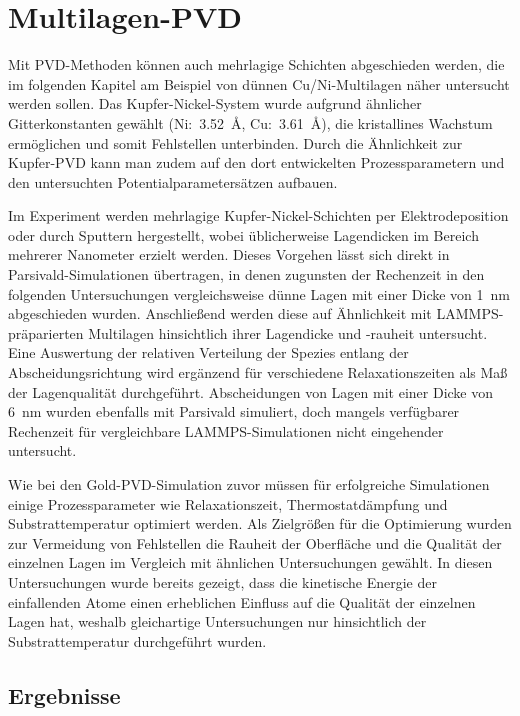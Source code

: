 \section{Multilagen-PVD}
\label{multilayer}

Mit PVD-Methoden können auch mehrlagige Schichten abgeschieden werden, die im folgenden Kapitel am Beispiel von dünnen Cu/Ni-Multilagen näher untersucht werden sollen.
Das Kupfer-Nickel-System wurde aufgrund ähnlicher Gitterkonstanten gewählt (Ni:~\SI{3.52}{\angstrom}, Cu:~\SI{3.61}{\angstrom}), die kristallines Wachstum ermöglichen und somit Fehlstellen unterbinden.
Durch die Ähnlichkeit zur Kupfer-PVD kann man zudem auf den dort entwickelten Prozessparametern und den untersuchten Potentialparametersätzen aufbauen.

Im Experiment werden mehrlagige Kupfer-Nickel-Schichten per Elektro\-deposition\cite{yang_pulsed_1995} oder durch Sputtern\cite{cammarata_nanoindentation_1990} hergestellt, wobei üblicherweise Lagendicken im Bereich mehrerer Nanometer erzielt werden.
Dieses Vorgehen lässt sich direkt in Parsivald-Simulationen übertragen, in denen zugunsten der Rechenzeit in den folgenden Untersuchungen vergleichsweise dünne Lagen mit einer Dicke von \SI{1}{\nano\meter} abgeschieden wurden.
Anschließend werden diese auf Ähnlichkeit mit LAMMPS-präparierten Multilagen hinsichtlich ihrer Lagendicke und -rauheit untersucht.
Eine Auswertung der relativen Verteilung der Spezies entlang der Abscheidungsrichtung wird ergänzend für verschiedene Relaxationszeiten als Maß der Lagenqualität durchgeführt.
Abscheidungen von Lagen mit einer Dicke von \SI{6}{\nano\meter} wurden ebenfalls mit Parsivald simuliert, doch mangels verfügbarer Rechenzeit für vergleichbare LAMMPS-Simulationen nicht eingehender untersucht.

Wie bei den Gold-PVD-Simulation zuvor müssen für erfolgreiche Simulationen einige Prozessparameter wie Relaxationszeit, Thermostatdämpfung und Substrattemperatur optimiert werden.
Als Zielgrößen für die Optimierung wurden zur Vermeidung von Fehlstellen die Rauheit der Oberfläche und die Qualität der einzelnen Lagen im Vergleich mit ähnlichen Untersuchungen\cite{zhou_atomistic_1998} gewählt.
In diesen Untersuchungen wurde bereits gezeigt, dass die kinetische Energie der einfallenden Atome einen erheblichen Einfluss auf die Qualität der einzelnen Lagen hat, weshalb gleichartige Untersuchungen nur hinsichtlich der Substrattemperatur durchgeführt wurden.

\subsection{Ergebnisse}

